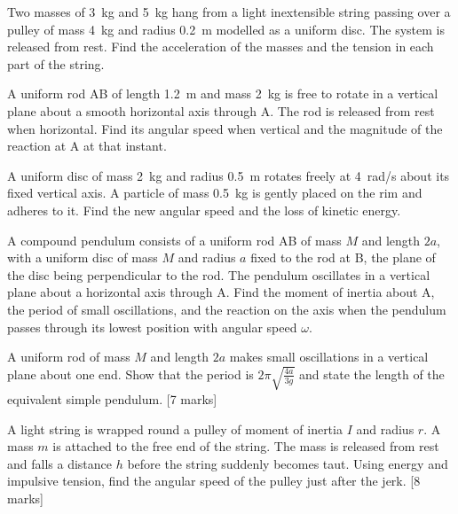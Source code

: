 \documentclass[11pt]{article}
\newcounter{popsec}
\newcounter{popsub}
\newcommand{\courssub}[1]{%
  \stepcounter{popsub}%
  \par\vspace{9pt}\noindent{\popxbold\fontsize{11.5}{13}\selectfont\color{popink}{\color{poporange}\thepopsec.\thepopsub}\hspace{6pt}#1}\par\nopagebreak\vspace{4pt}
}
\begin{document}
\courssub{I practise}

\begin{exercice}
Two masses of \SI{3}{kg} and \SI{5}{kg} hang from a light inextensible string passing over a pulley of mass \SI{4}{kg} and radius \SI{0.2}{m} modelled as a uniform disc. The system is released from rest. Find the acceleration of the masses and the tension in each part of the string.
\end{exercice}

\begin{exercice}
A uniform rod AB of length \SI{1.2}{m} and mass \SI{2}{kg} is free to rotate in a vertical plane about a smooth horizontal axis through A. The rod is released from rest when horizontal. Find its angular speed when vertical and the magnitude of the reaction at A at that instant.
\end{exercice}

\begin{exercice}
A uniform disc of mass \SI{2}{kg} and radius \SI{0.5}{m} rotates freely at \SI{4}{rad/s} about its fixed vertical axis. A particle of mass \SI{0.5}{kg} is gently placed on the rim and adheres to it. Find the new angular speed and the loss of kinetic energy.
\end{exercice}

\begin{exercice}
A compound pendulum consists of a uniform rod AB of mass $M$ and length $2a$, with a uniform disc of mass $M$ and radius $a$ fixed to the rod at B, the plane of the disc being perpendicular to the rod. The pendulum oscillates in a vertical plane about a horizontal axis through A. Find the moment of inertia about A, the period of small oscillations, and the reaction on the axis when the pendulum passes through its lowest position with angular speed $\omega$.
\end{exercice}

\courssub{I prepare for the GCE}

\begin{exercice}
A uniform rod of mass $M$ and length $2a$ makes small oscillations in a vertical plane about one end. Show that the period is $2\pi\sqrt{\frac{4a}{3g}}$ and state the length of the equivalent simple pendulum. [7 marks]
\end{exercice}

\begin{exercice}
A light string is wrapped round a pulley of moment of inertia $I$ and radius $r$. A mass $m$ is attached to the free end of the string. The mass is released from rest and falls a distance $h$ before the string suddenly becomes taut. Using energy and impulsive tension, find the angular speed of the pulley just after the jerk. [8 marks]
\end{exercice}
\end{document}
